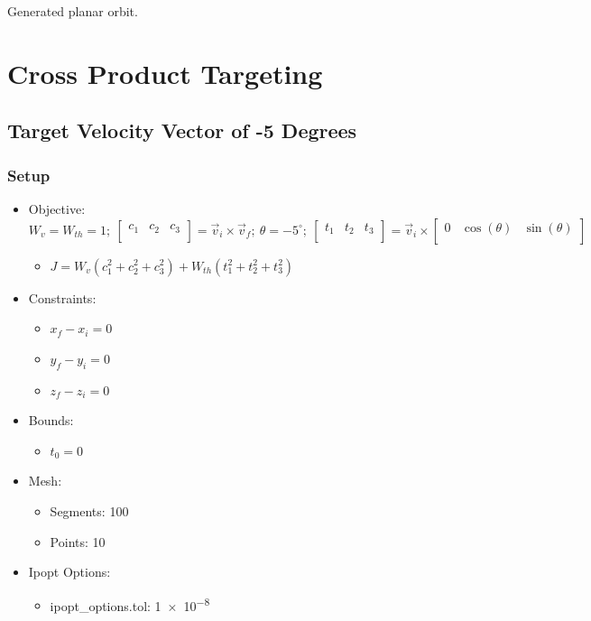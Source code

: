 \documentclass{article}
\begin{document}
Generated planar orbit.

\newpage

\section{Cross Product Targeting}

\subsection{Target Velocity Vector of -5 Degrees}

\subsubsection{Setup}

\begin{itemize}
    \item Objective: $W_v = W_{th} = 1;\ \left[\begin{matrix}c_1&c_2&c_3\\\end{matrix}\right] = \vec{v}_i\times\vec{v}_f;\ \theta=-5^\circ;\ \left[\begin{matrix}t_1&t_2&t_3\\\end{matrix}\right] = \vec{v}_i\times\left[\begin{matrix}0&\cos\left(\theta\right)&\sin\left(\theta\right)\\\end{matrix}\right]$
    \begin{itemize}
        \item $J = W_v\left(c_1^2 + c_2^2 + c_3^2\right) + W_{th}\left(t_1^2 + t_2^2 + t_3^2\right)$
    \end{itemize}
    \item Constraints:
    \begin{itemize}
        \item $x_f - x_i = 0$
        \item $y_f - y_i = 0$
        \item $z_f - z_i = 0$
    \end{itemize}
    \item Bounds:
    \begin{itemize}
        \item $t_0 = 0$
    \end{itemize}
    \item Mesh:
    \begin{itemize}
        \item Segments: 100
        \item Points: 10
    \end{itemize}
    \item Ipopt Options:
    \begin{itemize}
        \item ipopt\_options.tol: \num{1e-8}
    \end{itemize}
\end{itemize}
\end{document}

